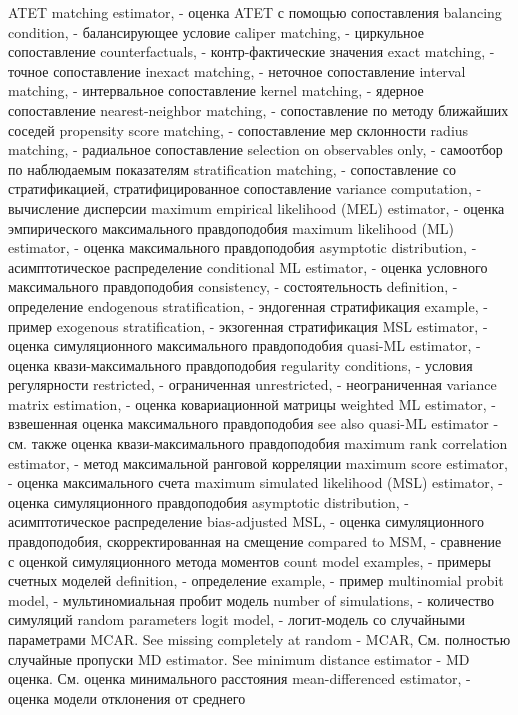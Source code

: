 ATET matching estimator, - оценка ATET с помощью сопоставления
balancing condition, - балансирующее условие
caliper matching, - циркульное сопоставление
counterfactuals, - контр-фактические значения
exact matching, - точное сопоставление
inexact matching, - неточное сопоставление
interval matching, - интервальное сопоставление
kernel matching, - ядерное сопоставление
nearest-neighbor matching, - сопоставление по методу ближайших соседей
propensity score matching, - сопоставление мер склонности
radius matching, - радиальное сопоставление
selection on observables only, - самоотбор по наблюдаемым показателям
stratification matching, - сопоставление со стратификацией, стратифицированное сопоставление
variance computation, - вычисление дисперсии
maximum empirical likelihood (MEL) estimator, - оценка эмпирического максимального правдоподобия
maximum likelihood (ML) estimator, - оценка максимального правдоподобия
asymptotic distribution, - асимптотическое распределение
conditional ML estimator, - оценка условного максимального правдоподобия
consistency, - состоятельность
definition, - определение
endogenous stratification, - эндогенная стратификация
example, - пример
exogenous stratification, - экзогенная стратификация
MSL estimator, - оценка симуляционного максимального правдоподобия
quasi-ML estimator, - оценка квази-максимального правдоподобия
regularity conditions, - условия регулярности
restricted, - ограниченная
unrestricted, - неограниченная
variance matrix estimation, - оценка ковариационной матрицы
weighted ML estimator, - взвешенная оценка максимального правдоподобия
see also quasi-ML estimator - см. также оценка квази-максимального правдоподобия
maximum rank correlation estimator, - метод максимальной ранговой корреляции
maximum score estimator, - оценка максимального счета
maximum simulated likelihood (MSL) estimator, - оценка симуляционного правдоподобия
asymptotic distribution, - асимптотическое распределение
bias-adjusted MSL, - оценка симуляционного правдоподобия, скорректированная на смещение
compared to MSM, - сравнение с оценкой симуляционного метода моментов
count model examples, - примеры счетных моделей
definition, - определение
example, - пример
multinomial probit model, - мультиномиальная пробит модель
number of simulations, - количество симуляций
random parameters logit model, - логит-модель со случайными параметрами
MCAR. See missing completely at random - MCAR, См. полностью случайные пропуски
MD estimator. See minimum distance estimator - MD оценка. См. оценка минимального расстояния
mean-differenced estimator, - оценка модели отклонения от среднего
